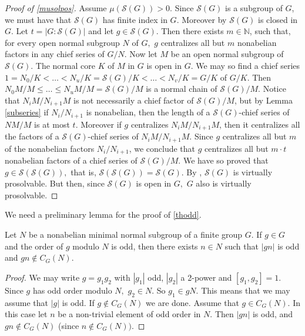\documentclass{amsart}
\numberwithin{equation}{section}
\begin{document}
\begin{proof}[Proof of \cref{musolpos}]
	Assume $\mu(\mathcal S(G))>0.$ Since $\mathcal S(G)$ is a subgroup of $G$, we must have that $\mathcal S(G)$ has finite index in $G$. Moreover by \cite[Lemma 1.1 (2)]{bm} $\mathcal S(G)$ is closed in $G.$ Let $t=|G:\mathcal S(G)|$  and let $g\in \mathcal S(G)$. Then there exists $m\in \mathbb N$, such that, for every open normal subgroup $N$ of $G,$ $g$ centralizes all but $m$ nonabelian factors in any chief series of $G/N.$ Now let $M$ be an open normal subgroup of $\mathcal S(G)$. The normal core $K$ of $M$ in $G$ is open in $G$. We may so find a chief series
	$1=N_0/K < \dots < N_u/K=\mathcal S(G)/K<\dots  < N_v/K=G/K$ of $G/K$. Then
	$N_0M/M \leq \dots \leq N_uM/M=\mathcal S(G)/M$ is a normal chain of $\mathcal S(G)/M.$ Notice that $N_iM/N_{i+1}M$ is not necessarily a chief factor of $\mathcal S(G)/M$, but by Lemma \ref{subseries} if $N_i/N_{i+1}$ is nonabelian, then the length of a $\mathcal S(G)$-chief series of
	$NM/M$ is at most $t$. Moreover if $g$ centralizes $N_iM/N_{i+1}M$, then it centralizes all the factors of a $\mathcal S(G)$-chief series of $N_iM/N_{i+1}M.$ Since $g$ centralizes all but $m$ of the nonabelian factors $N_i/N_{i+1}$, we conclude that $g$ centralizes all but $m\cdot t$  nonabelian factors of a chief series of $\mathcal S(G)/M.$ We have so proved that $g\in \mathcal S(\mathcal S(G)),$ that is, $\mathcal S(\mathcal S(G))=\mathcal S(G).$ By \cite[Theorem 1.2]{aemp}, $\mathcal S(G)$ is virtually prosolvable. But then, since $\mathcal S(G)$ is open in $G,$ $G$ also is virtually prosolvable.
\end{proof}



We need a preliminary lemma for the proof of \cref{thodd}.

\begin{lemma}\label{oddele}
Let $N$ be a nonabelian minimal normal subgroup of a finite group $G$. If $g\in G$ and the order of $g$ modulo $N$ is odd, then there exists $n\in N$ such that $|gn|$ is odd and $gn \notin C_G(N).$
\end{lemma}

\begin{proof}
We may write $g=g_1g_2$ with $|g_1|$ odd, $|g_2|$ a 2-power and $[g_1,g_2]=1.$ Since $g$ has odd order modulo $N,$ $g_2\in N.$ So $g_1\in gN.$ This means that we may assume that $|g|$ is odd. If $g\notin C_G(N)$ we are done. Assume that $g\in C_G(N)$. In this case let $n$ be a non-trivial element of odd order in $N$. Then $|gn|$ is odd, and $gn\notin C_G(N)$ (since $n\notin C_G(N))$.
\end{proof}
\end{document}
